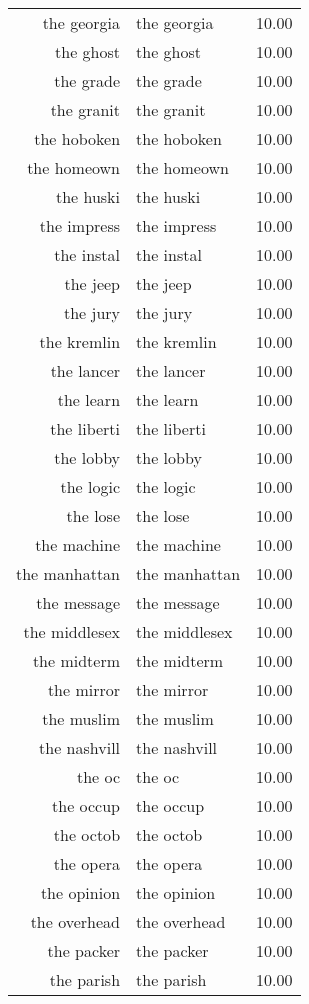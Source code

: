 \begin{table}[ht]
\begin{tabular}{rlr}
  the georgia & the georgia & 10.00 \\ 
  the ghost & the ghost & 10.00 \\ 
  the grade & the grade & 10.00 \\ 
  the granit & the granit & 10.00 \\ 
  the hoboken & the hoboken & 10.00 \\ 
  the homeown & the homeown & 10.00 \\ 
  the huski & the huski & 10.00 \\ 
  the impress & the impress & 10.00 \\ 
  the instal & the instal & 10.00 \\ 
  the jeep & the jeep & 10.00 \\ 
  the jury & the jury & 10.00 \\ 
  the kremlin & the kremlin & 10.00 \\ 
  the lancer & the lancer & 10.00 \\ 
  the learn & the learn & 10.00 \\ 
  the liberti & the liberti & 10.00 \\ 
  the lobby & the lobby & 10.00 \\ 
  the logic & the logic & 10.00 \\ 
  the lose & the lose & 10.00 \\ 
  the machine & the machine & 10.00 \\ 
  the manhattan & the manhattan & 10.00 \\ 
  the message & the message & 10.00 \\ 
  the middlesex & the middlesex & 10.00 \\ 
  the midterm & the midterm & 10.00 \\ 
  the mirror & the mirror & 10.00 \\ 
  the muslim & the muslim & 10.00 \\ 
  the nashvill & the nashvill & 10.00 \\ 
  the oc & the oc & 10.00 \\ 
  the occup & the occup & 10.00 \\ 
  the octob & the octob & 10.00 \\ 
  the opera & the opera & 10.00 \\ 
  the opinion & the opinion & 10.00 \\ 
  the overhead & the overhead & 10.00 \\ 
  the packer & the packer & 10.00 \\ 
  the parish & the parish & 10.00 \\ 

\end{tabular}
\end{table}
